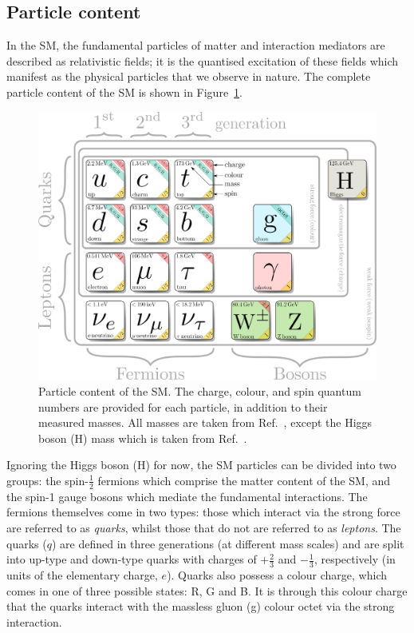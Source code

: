 \subsection{Particle content}\label{sec:sm_particlecontent}
In the SM, the fundamental particles of matter and interaction mediators are described as relativistic fields; it is the quantised excitation of these fields which manifest as the physical particles that we observe in nature. The complete particle content of the SM is shown in Figure~\ref{fig:sm_particlecontent}.

\begin{figure}
  \centering
  \includegraphics[width=1\linewidth]{Figures/theory/sm_drawing.pdf}
  \caption[Particle content of the SM]
  {
    Particle content of the SM. The charge, colour, and spin quantum numbers are provided for each particle, in addition to their measured masses. All masses are taken from Ref.~\cite{Zyla:2020zbs}, except the Higgs boson (H) mass which is taken from Ref.~\cite{Sirunyan:2020xwk}.
  }
  \label{fig:sm_particlecontent}
\end{figure}

Ignoring the Higgs boson (H) for now, the SM particles can be divided into two groups: the spin-$\frac{1}{2}$ fermions which comprise the matter content of the SM, and the spin-1 gauge bosons which mediate the fundamental interactions. The fermions themselves come in two types: those which interact via the strong force are referred to as \textit{quarks}, whilst those that do not are referred to as \textit{leptons}. The quarks ($q$) are defined in three generations (at different mass scales) and are split into up-type and down-type quarks with charges of $+\frac{2}{3}$ and $-\frac{1}{3}$, respectively (in units of the elementary charge, $e$). Quarks also possess a colour charge, which comes in one of three possible states: R, G and B. It is through this colour charge that the quarks interact with the massless gluon (g) colour octet via the strong interaction.

